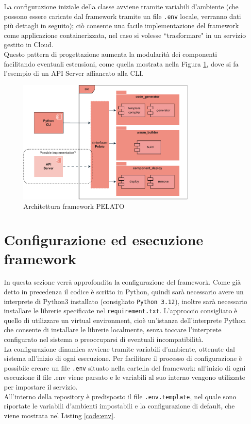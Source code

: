 La configurazione iniziale della classe avviene tramite variabili d'ambiente (che possono essere caricate dal framework tramite un file \texttt{.env} locale, verranno dati più dettagli in seguito); ciò consente una facile implementazione del framework come applicazione containerizzata, nel caso si volesse ``trasformare" in un servizio gestito in Cloud.\\
Questo pattern di progettazione aumenta la modularità dei componenti facilitando eventuali estensioni, come quella mostrata nella Figura \ref{fig:pelato_architecture}, dove si fa l'esempio di un API Server affiancato alla CLI.\\

\FloatBarrier
\begin{figure}[h]
    \centering
    \includegraphics[width=0.8\textwidth]{img/schemi/schemi-implementazione-struttura.drawio.pdf}
    \caption{Architettura framework PELATO}
    \label{fig:pelato_architecture}
\end{figure}
\FloatBarrier

\section{Configurazione ed esecuzione framework}

In questa sezione verrà approfondita la configurazione del framework. Come già detto in precedenza il codice è scritto in Python, quindi sarà necessario avere un interprete di Python3 installato (consigliato \texttt{Python 3.12}), inoltre sarà necessario installare le librerie specificate nel \texttt{requirement.txt}. L'approccio consigliato è quello di utilizzare un virtual environment, cioè un'istanza dell'interprete Python che consente di installare le librerie localmente, senza toccare l'interprete configurato nel sistema o preoccuparsi di eventuali incompatibilità.\\
La configurazione dinamica avviene tramite variabili d'ambiente, ottenute dal sistema all'inizio di ogni esecuzione. Per facilitare il processo di configurazione è possibile creare un file \texttt{.env} situato nella cartella del framework: all'inizio di ogni esecuzione il file .env viene parsato e le variabili al suo interno vengono utilizzate per impostare il servizio.\\
All'interno della repository è predisposto il file \texttt{.env.template}, nel quale sono riportate le variabili d'ambienti impostabili e la configurazione di default, che viene mostrata nel Listing \ref{code:env}.

